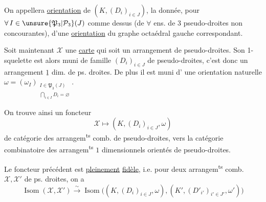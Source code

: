 On appellera \uline{orientation} de $(K,(D_i)_{i\in J})$, la
donnée, pour $\forall\, I\in\unsure{\mathfrak P_3|\mathcal P_3}(J)$ comme dessus
(de $\forall$ ens. de 3 pseudo-droites non concourantes),
d'une \uline{orientation}  du graphe
octaédral gauche correspondant.

Soit maintenant $\mathcal X$ une \uline{carte} qui
soit un arrangement de pseudo-droites.
Son 1-squelette  est alors muni de 
famille $(D_i)_{i\in J}$ de pseudo-droites, c'est
donc un arrangement $\underline{1}$ dim. de
ps. droites. De plus il est muni d'
une orientation naturelle $\omega=(\omega_I)_{\substack{I\in\mathfrak P_3(J)\\\bigcap_{i\in I}D_i=\varnothing}}$.

On trouve ainsi un foncteur
\[\mathcal X\longmapsto (K,(D_i)_{i\in J},\omega)\tag*{(18)}\]
de  catégorie des arrangem\textsuperscript{ts} comb. de
pseudo-droites, vers la catégorie combinatoire
des arrangem\textsuperscript{ts} $1$ dimensionnels orientés de
pseudo-droites.

%
\uline{} Le foncteur précédent est \uline{pleinement}
\uline{fidèle}, i.e. pour deux arrangem\textsuperscript{ts} comb.
$\mathcal X,\mathcal X'$ de ps. droites, on a
\[\operatorname{Isom}(\mathcal X,\mathcal X')\xrightarrow{\sim}\operatorname{Isom}\big((K,(D_i)_{i\in J},\omega),(K',(D'_{i'})_{i'\in J'},\omega')\big)\]
